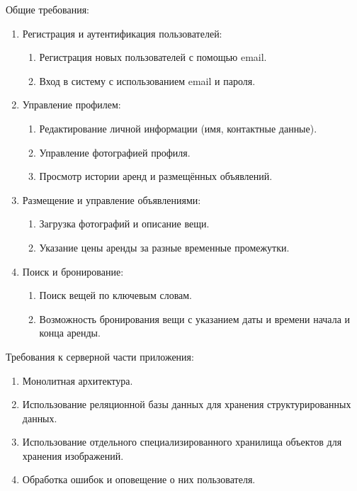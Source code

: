 \documentclass[14pt]{extarticle}
\begin{document}
Общие требования:
\begin{enumerate}

    \item Регистрация и аутентификация пользователей:
    \begin{enumerate}
        \item Регистрация новых пользователей с помощью email.
        \item Вход в систему с использованием email и пароля.
    \end{enumerate}

    \item Управление профилем:
    \begin{enumerate}
        \item Редактирование личной информации (имя, контактные данные).
        \item Управление фотографией профиля.
        \item Просмотр истории аренд и размещённых объявлений.
    \end{enumerate}

    \item Размещение и управление объявлениями:
    \begin{enumerate}
        \item Загрузка фотографий и описание вещи.
        \item Указание цены аренды за разные временные промежутки.
    \end{enumerate}

    \item Поиск и бронирование:
    \begin{enumerate}
        \item Поиск вещей по ключевым словам.
        \item Возможность бронирования вещи с указанием даты и времени
            начала и конца аренды.
    \end{enumerate}
    
\end{enumerate}

\bigskip

Требования к серверной части приложения:
\begin{enumerate}
    \item Монолитная архитектура.
    \item Использование реляционной базы данных для хранения
        структурированных данных.
    \item Использование отдельного специализированного хранилища объектов
        для хранения изображений.
    \item Обработка ошибок и оповещение о них пользователя.
\end{enumerate}
\end{document}

